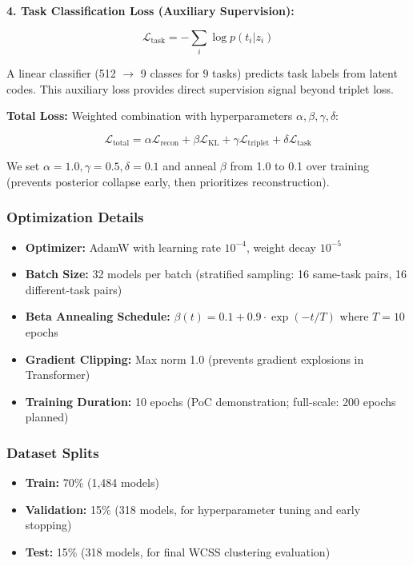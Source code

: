 \textbf{4. Task Classification Loss (Auxiliary Supervision):}

\begin{equation}
\mathcal{L}_{\text{task}} = -\sum_{i} \log p(t_i | z_i)
\end{equation}

A linear classifier (512 $\rightarrow$ 9 classes for 9 tasks) predicts task labels from latent codes. This auxiliary loss provides direct supervision signal beyond triplet loss.

\textbf{Total Loss:} Weighted combination with hyperparameters $\alpha, \beta, \gamma, \delta$:

\begin{equation}
\mathcal{L}_{\text{total}} = \alpha \mathcal{L}_{\text{recon}} + \beta \mathcal{L}_{\text{KL}} + \gamma \mathcal{L}_{\text{triplet}} + \delta \mathcal{L}_{\text{task}}
\end{equation}

We set $\alpha=1.0, \gamma=0.5, \delta=0.1$ and anneal $\beta$ from 1.0 to 0.1 over training (prevents posterior collapse early, then prioritizes reconstruction).

\subsubsection{Optimization Details}

\begin{itemize}
\item \textbf{Optimizer:} AdamW with learning rate $10^{-4}$, weight decay $10^{-5}$
\item \textbf{Batch Size:} 32 models per batch (stratified sampling: 16 same-task pairs, 16 different-task pairs)
\item \textbf{Beta Annealing Schedule:} $\beta(t) = 0.1 + 0.9 \cdot \exp(-t / T)$ where $T=10$ epochs
\item \textbf{Gradient Clipping:} Max norm 1.0 (prevents gradient explosions in Transformer)
\item \textbf{Training Duration:} 10 epochs (PoC demonstration; full-scale: 200 epochs planned)
\end{itemize}

\subsubsection{Dataset Splits}

\begin{itemize}
\item \textbf{Train:} 70\% (1,484 models)
\item \textbf{Validation:} 15\% (318 models, for hyperparameter tuning and early stopping)
\item \textbf{Test:} 15\% (318 models, for final WCSS clustering evaluation)
\end{itemize}

